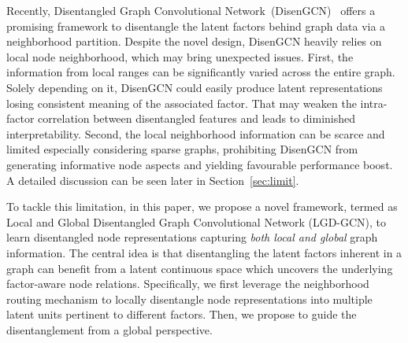 \documentclass[accepted]{uai2021} %
\begin{document}
Recently, Disentangled Graph Convolutional Network~(DisenGCN)~\citep{Ma2019DisentangledGC} offers a promising framework to disentangle the latent factors behind graph data via a neighborhood partition. Despite the novel design, DisenGCN heavily relies on local node neighborhood, which may bring unexpected issues. First, the information from local ranges can be significantly varied across the entire graph. Solely depending on it, DisenGCN could easily produce latent representations losing consistent meaning of the associated factor. That may weaken the intra-factor correlation between disentangled features and leads to diminished interpretability. Second, the local neighborhood information can be scarce and limited especially considering sparse graphs, prohibiting DisenGCN from generating informative node aspects and yielding favourable performance boost. A detailed discussion can be seen later in Section~\ref{sec:limit}.

 
To tackle this limitation, in this paper, we propose a novel framework, termed as Local and Global Disentangled Graph Convolutional Network (LGD-GCN), to learn disentangled node representations capturing \emph{both local and global} graph information. The central idea is that disentangling the latent factors inherent in a graph can benefit from a latent continuous space which uncovers the underlying factor-aware node relations. Specifically, we first leverage the neighborhood routing mechanism to locally disentangle node representations into multiple latent units pertinent to different factors. Then, we propose to guide the disentanglement from a global perspective.
\end{document}
